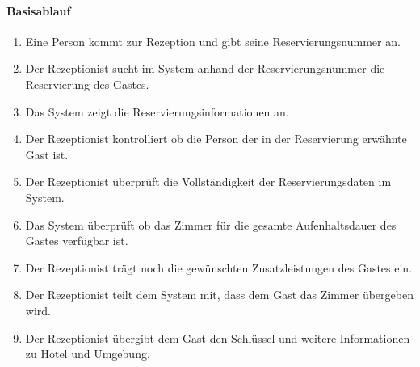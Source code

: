 \paragraph{Basisablauf}
\begin{enumerate}
	\item Eine Person kommt zur \Gls{Rezeption} und gibt seine \Gls{Reservierungsnummer} an.
	\item Der \Gls{Rezeptionist} sucht im System anhand der \Gls{Reservierungsnummer} die Reservierung des \Gls{Gast}es.
	\item Das System zeigt die Reservierungsinformationen an.
	\item Der \Gls{Rezeptionist} kontrolliert ob die Person der in der \Gls{Reservierung} erwähnte \Gls{Gast} ist.
	\item Der \Gls{Rezeptionist} überprüft die Vollständigkeit der Reservierungsdaten im System.
	\item Das System überprüft ob das \Gls{Zimmer} für die gesamte Aufenhaltsdauer des \Gls{Gast}es verfügbar ist.
	\item Der \Gls{Rezeptionist} trägt noch die gewünschten \Gls{Zusatzleistung}en des \Gls{Gast}es ein.
	\item Der \Gls{Rezeptionist} teilt dem System mit, dass dem \Gls{Gast} das \Gls{Zimmer} übergeben wird.
	\item Der \Gls{Rezeptionist} übergibt dem \Gls{Gast} den Schlüssel und weitere Informationen zu Hotel und Umgebung.
\end{enumerate}

